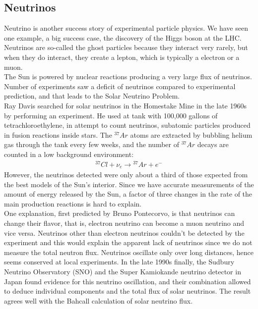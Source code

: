 \documentclass[11pt]{article}
\theoremstyle{break}
\theoremstyle{break}
\begin{document}
\subsection{Neutrinos}
Neutrino is another success story of experimental particle physics. We have seen one example, a big success case, the discovery of the Higgs boson at the LHC. Neutrinos are so-called the ghost particles because they interact very rarely, but when they do interact, they create a lepton, which is typically a electron or a muon. \\

The Sun is powered by nuclear reactions producing a very large flux of neutrinos. Number of experiments saw a deficit of neutrinos compared to experimental prediction, and that leads to the Solar Neutrino Problem. \\

Ray Davis searched for solar neutrinos in the Homestake Mine in the late 1960s by performing an experiment. He used at tank with 100,000 gallons of tetrachloroethylene, in attempt to count neutrinos, subatomic particles
produced in fusion reactions inside stars.  The ${}^{37}Ar$ atoms are extracted by bubbling helium gas through the tank every few weeks, and the number of ${}^{37}Ar$ decays are counted in a low background environment:
\begin{align*}
^{37}Cl + \nu_e \to {}^{37} Ar + e^-
\end{align*}
However, the neutrinos detected were only about a third of those expected from the best models of the Sun's interior. Since we have accurate measurements of the amount of energy released by the Sun, a factor of three changes in the rate of the main production reactions is hard to explain.\\

One explanation, first predicted by Bruno Pontecorvo, is that neutrinos can change their flavor, that is, electron neutrino can become a muon neutrino and vice versa. Neutrinos other than electron neutrinos couldn't be detected by the experiment and this would explain the apparent lack of neutrinos since we do not measure
the total neutron flux. Neutrinos oscillate only over long distances, hence seems conserved at local experiments. In the late 1990s finally, the Sudbury Neutrino Observatory (SNO) and the Super Kamiokande neutrino detector in Japan found evidence for this neutrino oscillation, and their combination allowed to deduce individual components and the total flux of solar neutrinos. The result agrees well with the Bahcall calculation of solar neutrino flux. 
\end{document}
